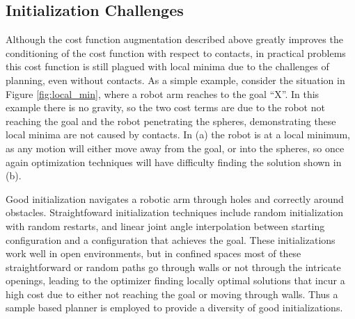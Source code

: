 \documentclass[../thesis.tex]{subfiles}
\begin{document}
\subsection{Initialization Challenges}
Although the cost function augmentation described above greatly improves the conditioning of the cost function with respect to contacts, in practical problems this cost function is still plagued with local minima due to the challenges of planning, even without contacts.
As a simple example, consider the situation in Figure \ref{fig:local_min}, where a robot arm reaches to the goal ``X''.
In this example there is no gravity, so the two cost terms are due to the robot not reaching the goal and the robot penetrating the spheres, demonstrating these local minima are not caused by contacts.
In (a) the robot is at a local minimum, as any motion will either move away from the goal, or into the spheres, so once again optimization techniques will have difficulty finding the solution shown in (b).

Good initialization navigates a robotic arm through holes and correctly around obstacles.
Straightfoward initialization techniques include random initialization with random restarts, and linear joint angle interpolation between starting configuration and a configuration that achieves the goal.
These initializations work well in open environments, but in confined spaces most of these straightforward or random paths go through walls or not through the intricate openings, leading to the optimizer finding locally optimal solutions that incur a high cost due to either not reaching the goal or moving through walls.
Thus a sample based planner is employed to provide a diversity of good initializations.
\end{document}
